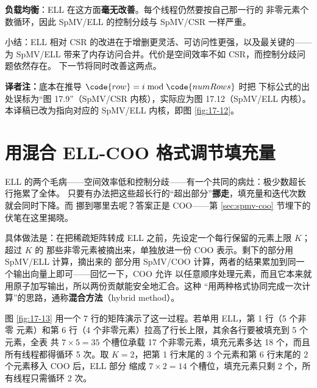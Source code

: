 \textbf{负载均衡}：ELL 在这方面\textbf{毫无改善}。每个线程仍然要按自己那一行的
非零元素个数循环，因此 SpMV/ELL 的控制分歧与 SpMV/CSR 一样严重。

小结：ELL 相对 CSR 的改进在于增删更灵活、可访问性更强，以及最关键的——为
SpMV/ELL 带来了内存访问合并。代价是空间效率不如 CSR，而控制分歧问题依然存在。
下一节将同时改善这两点。

\noindent\textbf{译者注：}底本在推导 $\code{row} = i \bmod \code{numRows}$ 时把
下标公式的出处误标为“图 17.9”（SpMV/CSR 内核），实际应为图 17.12（SpMV/ELL 内核）。
本译稿已改为指向对应的 SpMV/ELL 内核，即图 \ref{fig:17-12}。

\section{用混合 ELL-COO 格式调节填充量}
\label{sec:spmv-hybrid}

ELL 的两个毛病——空间效率低和控制分歧——有一个共同的病灶：极少数超长行拖累了全体。
只要有办法把这些超长行的“超出部分”\textbf{挪走}，填充量和迭代次数就会同时下降。而
挪到哪里去呢？答案正是 COO——第 \ref{sec:spmv-coo} 节埋下的伏笔在这里揭晓。

具体做法是：在把稀疏矩阵转成 ELL 之前，先设定一个每行保留的元素上限 $K$；超过 $K$ 的
那些非零元素被摘出来，单独放进一份 COO 表示。剩下的部分用 SpMV/ELL 计算，摘出来的
部分用 SpMV/COO 计算，两者的结果累加到同一个输出向量上即可——回忆一下，COO 允许
以任意顺序处理元素，而且它本来就用原子加写输出，所以两份贡献能安全地汇合。这种
“用两种格式协同完成一次计算”的思路，通称\textbf{混合方法}（hybrid method）。

图 \ref{fig:17-13} 用一个 7 行的矩阵演示了这一过程。若单用 ELL，第 1 行（5 个非零
元素）和第 6 行（4 个非零元素）拉高了行长上限，其余各行要被填充到 5 个元素，全表
共 $7\times5=35$ 个槽位承载 17 个非零元素，填充元素多达 18 个，而且所有线程都得循环
5 次。取 $K=2$，把第 1 行末尾的 3 个元素和第 6 行末尾的 2 个元素移入 COO 后，ELL 部分
缩成 $7\times2=14$ 个槽位，填充元素只剩 2 个，所有线程只需循环 2 次。

